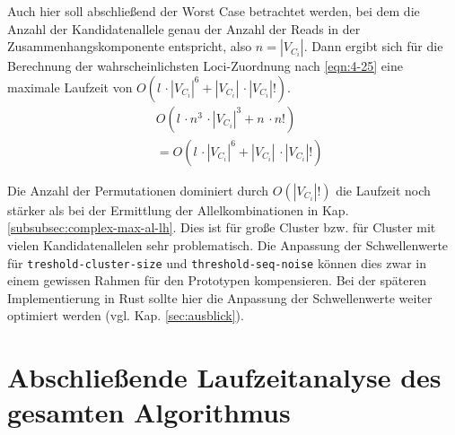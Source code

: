 Auch hier soll abschließend der Worst Case betrachtet werden, bei dem die Anzahl der Kandidatenallele genau der Anzahl der Reads in der Zusammenhangskomponente entspricht, also $ n = |V_{C_{i}}| $. Dann ergibt sich für die Berechnung der wahrscheinlichsten Loci-Zuordnung nach \eqref{eqn:4-25} eine maximale Laufzeit von $ O( l \, \cdotp |V_{C_{i}}|^6 + |V_{C_{i}}| \, \cdotp |V_{C_{i}}|!) $.
\begin{equation} \label{eqn:4-25}
\tag{4-25}
\begin{aligned}
&\ {} O( l\, \cdotp n^3  \, \cdotp |V_{C_{i}}|^3 + n  \, \cdotp n!)\\
&\ = O( l \, \cdotp |V_{C_{i}}|^6 + |V_{C_{i}}| \, \cdotp |V_{C_{i}}|!)
\end{aligned}
\end{equation}

Die Anzahl der Permutationen dominiert durch $ O(|V_{C_{i}}|!) $ die Laufzeit noch stärker als bei der Ermittlung der Allelkombinationen in Kap. \ref{subsubsec:complex-max-al-lh}. Dies ist für große Cluster bzw. für Cluster mit vielen Kandidatenallelen sehr problematisch. Die Anpassung der Schwellenwerte für \lstinline|treshold-cluster-size| und  \lstinline|threshold-seq-noise| können dies zwar in einem gewissen Rahmen für den Prototypen kompensieren. Bei der späteren Implementierung in Rust sollte hier die Anpassung der Schwellenwerte weiter optimiert werden (vgl. Kap. \ref{sec:ausblick}).

\section[Gesamtlaufzeit des Algorithmus]{Abschließende Laufzeitanalyse des gesamten Algorithmus}

